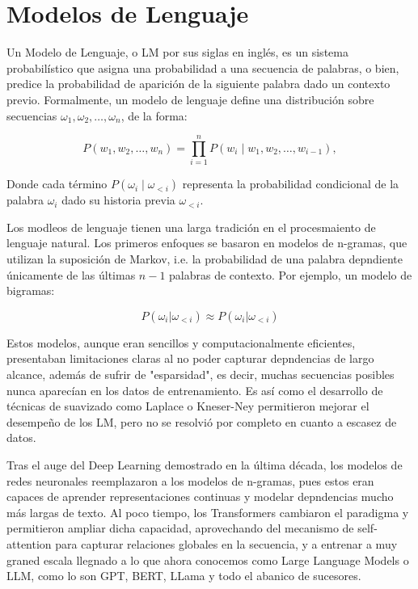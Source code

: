 \section*{Modelos de Lenguaje}

Un Modelo de Lenguaje, o LM por sus siglas en inglés, es un sistema probabilístico que asigna
una probabilidad a una secuencia de palabras, o bien, predice la probabilidad de aparición
de la siguiente palabra dado un contexto previo. Formalmente, un modelo de lenguaje define
una distribución sobre secuencias $\omega_1, \omega_2, \ldots, \omega_n$, de la forma:

\[
    P(w_1, w_2, \ldots, w_n) = \prod_{i=1}^n P(w_i \mid w_1, w_2, \ldots, w_{i-1}),
\]

Donde cada término $P(\omega_i \mid \omega_{<i})$ representa la probabilidad condicional de
la palabra $\omega_i$ dado su historia previa $\omega_{<i}$.

Los modleos de lenguaje tienen una larga tradición en el procesmaiento de lenguaje natural. 
Los primeros enfoques se basaron en modelos de n-gramas, que utilizan la suposición de Markov, i.e.
la probabilidad de una palabra depndiente únicamente de las últimas $n-1$ palabras de contexto. Por
ejemplo, un modelo de bigramas:

\[
    P(\omega_i | \omega_{<i}) \approx P(\omega_i | \omega_{<i})
\]

Estos modelos, aunque eran sencillos y computacionalmente eficientes, presentaban limitaciones claras
al no poder capturar depndencias de largo alcance, además de sufrir de "esparsidad", es decir,
muchas secuencias posibles nunca aparecían en los datos de entrenamiento. Es así como el 
desarrollo de técnicas de suavizado como Laplace o Kneser-Ney permitieron mejorar el desempeño de
los LM, pero no se resolvió por completo en cuanto a escasez de datos.

Tras el auge del Deep Learning demostrado en la última década, los modelos de redes neuronales 
reemplazaron a los modelos de n-gramas, pues estos eran capaces de aprender representaciones
continuas y modelar depndencias mucho más largas de texto. Al poco tiempo, los Transformers
cambiaron el paradigma y permitieron ampliar dicha capacidad, aprovechando del mecanismo de
self-attention para capturar relaciones globales en la secuencia, y a entrenar a muy graned escala
llegnado a lo que ahora conocemos como Large Language Models o LLM, como lo son GPT, BERT, LLama y 
todo el abanico de sucesores. 

